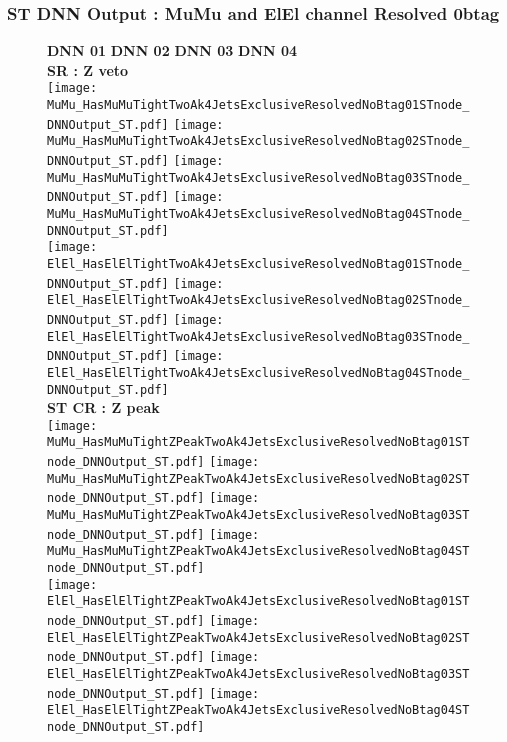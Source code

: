 \documentclass[9pt]{beamer}
\begin{document}
\begin{frame}
	\frametitle{ST DNN Output : MuMu and ElEl channel Resolved 0btag}
	\begin{figure}
	    \textbf{DNN 01} \hspace{1.2cm} \textbf{DNN 02} \hspace{1.2cm} \textbf{DNN 03} \hspace{1.2cm} \textbf{DNN 04} \\
        \centering
        \textbf{SR : Z veto} \\
		\texttt{[image: MuMu\_HasMuMuTightTwoAk4JetsExclusiveResolvedNoBtag01STnode\_DNNOutput\_ST.pdf]}
		\texttt{[image: MuMu\_HasMuMuTightTwoAk4JetsExclusiveResolvedNoBtag02STnode\_DNNOutput\_ST.pdf]}
		\texttt{[image: MuMu\_HasMuMuTightTwoAk4JetsExclusiveResolvedNoBtag03STnode\_DNNOutput\_ST.pdf]}
		\texttt{[image: MuMu\_HasMuMuTightTwoAk4JetsExclusiveResolvedNoBtag04STnode\_DNNOutput\_ST.pdf]}\\
		\texttt{[image: ElEl\_HasElElTightTwoAk4JetsExclusiveResolvedNoBtag01STnode\_DNNOutput\_ST.pdf]}
		\texttt{[image: ElEl\_HasElElTightTwoAk4JetsExclusiveResolvedNoBtag02STnode\_DNNOutput\_ST.pdf]}
		\texttt{[image: ElEl\_HasElElTightTwoAk4JetsExclusiveResolvedNoBtag03STnode\_DNNOutput\_ST.pdf]}
		\texttt{[image: ElEl\_HasElElTightTwoAk4JetsExclusiveResolvedNoBtag04STnode\_DNNOutput\_ST.pdf]}\\
        \textbf{ST CR : Z peak} \\
		\texttt{[image: MuMu\_HasMuMuTightZPeakTwoAk4JetsExclusiveResolvedNoBtag01STnode\_DNNOutput\_ST.pdf]}
		\texttt{[image: MuMu\_HasMuMuTightZPeakTwoAk4JetsExclusiveResolvedNoBtag02STnode\_DNNOutput\_ST.pdf]}
		\texttt{[image: MuMu\_HasMuMuTightZPeakTwoAk4JetsExclusiveResolvedNoBtag03STnode\_DNNOutput\_ST.pdf]}
		\texttt{[image: MuMu\_HasMuMuTightZPeakTwoAk4JetsExclusiveResolvedNoBtag04STnode\_DNNOutput\_ST.pdf]}\\
		\texttt{[image: ElEl\_HasElElTightZPeakTwoAk4JetsExclusiveResolvedNoBtag01STnode\_DNNOutput\_ST.pdf]}
		\texttt{[image: ElEl\_HasElElTightZPeakTwoAk4JetsExclusiveResolvedNoBtag02STnode\_DNNOutput\_ST.pdf]}
		\texttt{[image: ElEl\_HasElElTightZPeakTwoAk4JetsExclusiveResolvedNoBtag03STnode\_DNNOutput\_ST.pdf]}
		\texttt{[image: ElEl\_HasElElTightZPeakTwoAk4JetsExclusiveResolvedNoBtag04STnode\_DNNOutput\_ST.pdf]}\\
	\end{figure}
\end{frame}
\end{document}

